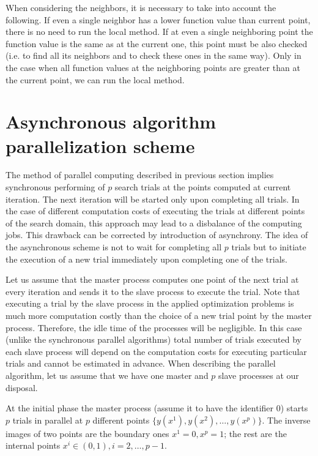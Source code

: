 \documentclass{cmi}
\begin{document}
When considering the neighbors, it is necessary to take into account the following. If even a single  neighbor has a lower function value than current point, there is no need to run the local method. If at  even a single neighboring point the function value is the same as at the current one, this point must be also checked (i.e. to find all its neighbors and to check these ones in the same way). Only in the case when  all function values at the neighboring points are greater than at the current point, we can run the local  method.


\section{Asynchronous algorithm parallelization scheme}\label{SecASP}

The method of parallel computing described in  previous section implies synchronous  performing of $p$ search trials at the points computed at current iteration. The next iteration will be  started only upon completing all trials. In the case of different computation costs of executing the trials at different points of the search  domain, this approach may lead to a disbalance of the computing jobs.  This drawback can be corrected by introduction of asynchrony. The idea of the asynchronous scheme is not to wait for completing all $p$ trials but to initiate the  execution of a new trial immediately upon completing one of the trials. 

Let us assume that the master process computes one point of the next trial at every iteration and sends  it to the slave process to execute the trial. Note that executing a trial by the slave process in  the applied optimization problems is much more computation costly than the choice of a new trial point  by the master process. Therefore, the idle time of the processes will be negligible. In this  case (unlike the synchronous parallel algorithms) total number of trials executed by each slave  process will depend on the computation costs for executing particular trials and cannot be estimated in  advance. When describing the parallel algorithm, let us assume that we have one master and $p$ slave processes at our disposal.

At the initial phase the master process (assume it to have the identifier $0$) starts $p$ trials in parallel at $p$ different points $\{y\left(x^1\right),y\left(x^2\right),\ldots,y\left(x^p\right)\}$.
The inverse images of two points are the boundary ones $x^1=0,x^p=1$; the rest are the internal points $x^i\in\left(0,1\right),i=2,\ldots,p-1$.
\end{document}
